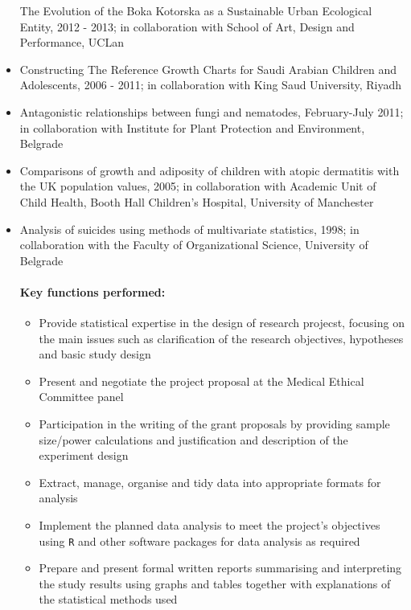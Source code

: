 \documentclass[
]{article}
\providecommand{\tightlist}{%
  \setlength{\itemsep}{0pt}\setlength{\parskip}{0pt}}
\begin{document}
\begin{itemize}
  The Evolution of the Boka Kotorska as a Sustainable Urban Ecological
  Entity, 2012 - 2013; in collaboration with School of Art, Design and
  Performance, UCLan
\item
  Constructing The Reference Growth Charts for Saudi Arabian Children
  and Adolescents, 2006 - 2011; in collaboration with King Saud
  University, Riyadh
\item
  Antagonistic relationships between fungi and nematodes, February-July
  2011; in collaboration with Institute for Plant Protection and
  Environment, Belgrade
\item
  Comparisons of growth and adiposity of children with atopic dermatitis
  with the UK population values, 2005; in collaboration with Academic
  Unit of Child Health, Booth Hall Children's Hospital, University of
  Manchester
\item
  Analysis of suicides using methods of multivariate statistics, 1998;
  in collaboration with the Faculty of Organizational Science,
  University of Belgrade

  \hypertarget{key-functions-performed}{%
  \paragraph{Key functions performed:}\label{key-functions-performed}}

  \begin{itemize}
  \tightlist
  \item
    Provide statistical expertise in the design of research projecst,
    focusing on the main issues such as clarification of the research
    objectives, hypotheses and basic study design
  \item
    Present and negotiate the project proposal at the Medical Ethical
    Committee panel
  \item
    Participation in the writing of the grant proposals by providing
    sample size/power calculations and justification and description of
    the experiment design
  \item
    Extract, manage, organise and tidy data into appropriate formats for
    analysis
  \item
    Implement the planned data analysis to meet the project's objectives
    using \texttt{R} and other software packages for data analysis as
    required
  \item
    Prepare and present formal written reports summarising and
    interpreting the study results using graphs and tables together with
    explanations of the statistical methods used
  \end{itemize}
\end{itemize}
\end{document}
